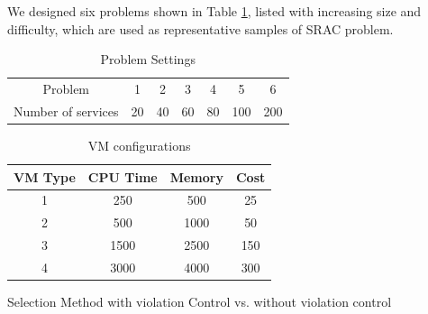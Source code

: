 We designed six problems shown in Table \ref{tab:problem}, listed with increasing size and difficulty, which are used as representative samples of SRAC problem.

\begin{table}[]
\centering
\caption{Problem Settings}
\label{tab:problem}
\begin{tabular}{ccccccc}
\hline 

Problem           & 1  & 2  & 3  & 4  & 5   & 6    \\
Number of services & 20 & 40 & 60 & 80 & 100 & 200 \\ \hline
\end{tabular}
\end{table}

\begin{table}[]
\centering
\caption{VM configurations}
\label{tab:vm}
\begin{tabular}{@{}cccc@{}}
\toprule
VM Type & CPU Time & Memory & Cost \\ \midrule
1       & 250      & 500    & 25 \\
2       & 500      & 1000   & 50 \\
3       & 1500     & 2500   & 150\\
4       & 3000     & 4000   & 300\\ \bottomrule
\end{tabular}
\end{table}
\begin{flushleft}Selection Method with violation Control vs. without violation control\end{flushleft}

